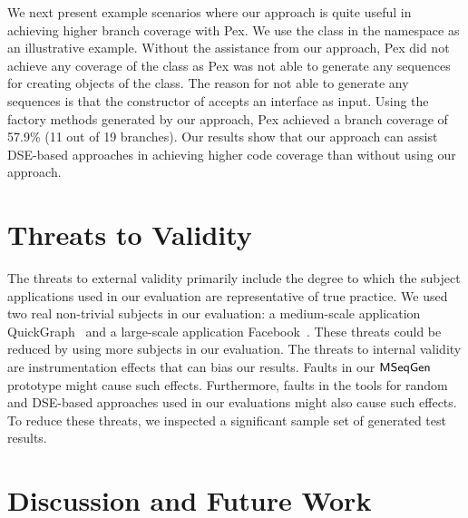 \documentclass{sig-alternate}
\begin{document}
We next present example scenarios where our approach is quite useful in achieving higher branch coverage with Pex. We use the   class in the  namespace as an illustrative example. Without the assistance from our approach, Pex did not achieve any coverage of the  class as Pex was not able to generate any sequences for creating objects of the  class. The reason for not able to generate any sequences is that the constructor of  accepts an interface as input. Using the factory methods generated by our approach, Pex achieved a branch coverage of 57.9\% (11 out of 19 branches). Our results show that our approach can assist DSE-based approaches in achieving higher code coverage than without using our approach.

\section{Threats to Validity}
\label{sec:threats}
The threats to external validity primarily include the degree to which the subject applications used in our evaluation are representative of true practice. We used two real non-trivial subjects in our evaluation: a medium-scale application QuickGraph~\cite{QUICKGRAPH} and a large-scale application Facebook~\cite{FACEBOOK}. These threats could be reduced by using more subjects in our evaluation. The threats to internal validity are instrumentation effects that can bias our results. Faults in our $\textsf{MSeqGen} $ prototype might cause such effects. Furthermore, faults in the tools for random and DSE-based approaches used in our evaluations might also cause such effects. To reduce these threats, we inspected a significant sample set of generated test results.

\section{Discussion and Future Work}
\label{sec:future}
\end{document}
